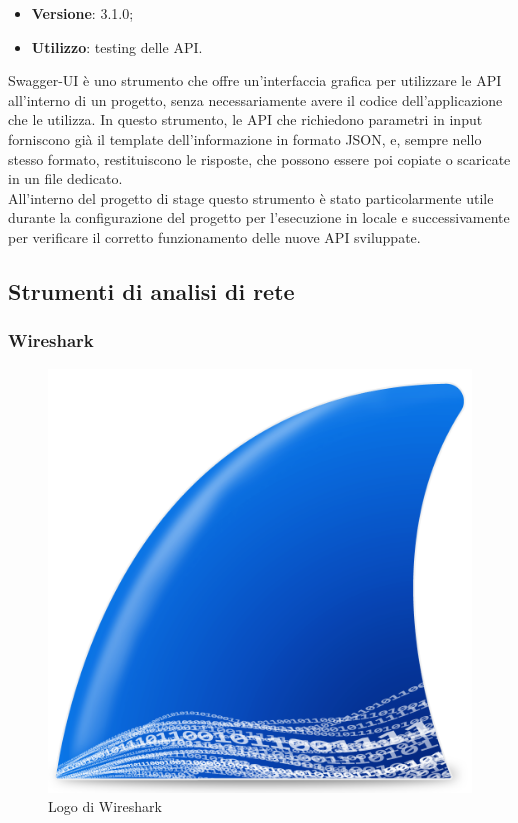 \begin{itemize}
    \item \textbf{Versione}: 3.1.0;
    \item \textbf{Utilizzo}: testing delle API.
\end{itemize}
Swagger-UI è uno strumento che offre un'interfaccia grafica per utilizzare le API all'interno di un progetto, senza necessariamente avere il codice dell'applicazione che le utilizza. In questo strumento, le API che richiedono parametri in input forniscono già il template dell'informazione in formato JSON, e, sempre nello stesso formato, restituiscono le risposte, che possono essere poi copiate o scaricate in un file dedicato.\\
All'interno del progetto di stage questo strumento è stato particolarmente utile durante la configurazione del progetto per l'esecuzione in locale e successivamente per verificare il corretto funzionamento delle nuove API sviluppate.






\subsection{Strumenti di analisi di rete}

\subsubsection{Wireshark}

\begin{figure}[H]
    \centering 
    \includegraphics[width=0.17\columnwidth]{images/loghi/wireshark.png} 
    \caption{Logo di Wireshark}
\end{figure}

